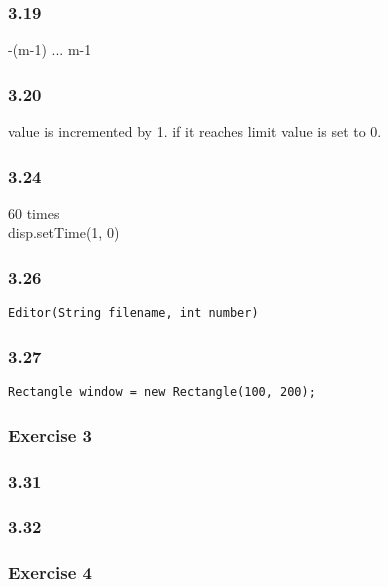 \subsubsection*{3.19}
-(m-1) ... m-1
\subsubsection*{3.20}
value is incremented by 1. if it reaches limit value is set to 0. 
\subsubsection*{3.24}
60 times \\
disp.setTime(1, 0)
\subsubsection*{3.26}
\begin{lstlisting}
Editor(String filename, int number)
\end{lstlisting}
\subsubsection*{3.27}
\begin{lstlisting}
Rectangle window = new Rectangle(100, 200);
\end{lstlisting}

\subsubsection*{Exercise 3}
\subsubsection*{3.31}




\subsubsection*{3.32}

\subsubsection*{Exercise 4}

